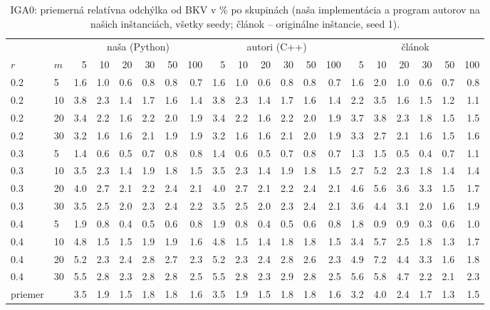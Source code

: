 \begin{table}[ht]
\centering
\scriptsize
\setlength{\tabcolsep}{3pt}
\caption{IGA0: priemerná relatívna odchýlka od BKV v \% po skupinách (naša implementácia a program autorov na našich inštanciách, všetky seedy; článok – originálne inštancie, seed 1).}
\label{tab:rpd_iga0}
\begin{tabular}{ll|rrrrrr|rrrrrr|rrrrrr}
\toprule
 &  & \multicolumn{6}{c}{naša (Python)} & \multicolumn{6}{c}{autori (C++)} & \multicolumn{6}{c}{článok} \\
$r$ & $m$ & 5 & 10 & 20 & 30 & 50 & 100 & 5 & 10 & 20 & 30 & 50 & 100 & 5 & 10 & 20 & 30 & 50 & 100 \\
\midrule
0.2 & 5 & 1.6 & 1.0 & 0.6 & 0.8 & 0.8 & 0.7 & 1.6 & 1.0 & 0.6 & 0.8 & 0.8 & 0.7 & 1.6 & 2.0 & 1.0 & 0.6 & 0.7 & 0.8 \\
0.2 & 10 & 3.8 & 2.3 & 1.4 & 1.7 & 1.6 & 1.4 & 3.8 & 2.3 & 1.4 & 1.7 & 1.6 & 1.4 & 2.2 & 3.5 & 1.6 & 1.5 & 1.2 & 1.1 \\
0.2 & 20 & 3.4 & 2.2 & 1.6 & 2.2 & 2.0 & 1.9 & 3.4 & 2.2 & 1.6 & 2.2 & 2.0 & 1.9 & 3.7 & 3.8 & 2.3 & 1.8 & 1.5 & 1.5 \\
0.2 & 30 & 3.2 & 1.6 & 1.6 & 2.1 & 1.9 & 1.9 & 3.2 & 1.6 & 1.6 & 2.1 & 2.0 & 1.9 & 3.3 & 2.7 & 2.1 & 1.6 & 1.5 & 1.6 \\
0.3 & 5 & 1.4 & 0.6 & 0.5 & 0.7 & 0.8 & 0.8 & 1.4 & 0.6 & 0.5 & 0.7 & 0.8 & 0.7 & 1.3 & 1.5 & 0.5 & 0.4 & 0.7 & 1.1 \\
0.3 & 10 & 3.5 & 2.3 & 1.4 & 1.9 & 1.8 & 1.5 & 3.5 & 2.3 & 1.4 & 1.9 & 1.8 & 1.5 & 2.7 & 5.2 & 2.3 & 1.8 & 1.4 & 1.4 \\
0.3 & 20 & 4.0 & 2.7 & 2.1 & 2.2 & 2.4 & 2.1 & 4.0 & 2.7 & 2.1 & 2.2 & 2.4 & 2.1 & 4.6 & 5.6 & 3.6 & 3.3 & 1.5 & 1.7 \\
0.3 & 30 & 3.5 & 2.5 & 2.0 & 2.3 & 2.4 & 2.2 & 3.5 & 2.5 & 2.0 & 2.3 & 2.4 & 2.1 & 3.6 & 4.4 & 3.1 & 2.0 & 1.6 & 1.9 \\
0.4 & 5 & 1.9 & 0.8 & 0.4 & 0.5 & 0.6 & 0.8 & 1.9 & 0.8 & 0.4 & 0.5 & 0.6 & 0.8 & 1.8 & 0.9 & 0.9 & 0.3 & 0.6 & 1.0 \\
0.4 & 10 & 4.8 & 1.5 & 1.5 & 1.9 & 1.9 & 1.6 & 4.8 & 1.5 & 1.4 & 1.8 & 1.8 & 1.5 & 3.4 & 5.7 & 2.5 & 1.8 & 1.3 & 1.7 \\
0.4 & 20 & 5.2 & 2.3 & 2.4 & 2.8 & 2.7 & 2.3 & 5.2 & 2.3 & 2.4 & 2.8 & 2.6 & 2.3 & 4.9 & 7.2 & 4.4 & 3.3 & 1.6 & 1.8 \\
0.4 & 30 & 5.5 & 2.8 & 2.3 & 2.8 & 2.8 & 2.5 & 5.5 & 2.8 & 2.3 & 2.9 & 2.8 & 2.5 & 5.6 & 5.8 & 4.7 & 2.2 & 2.1 & 2.3 \\
\midrule
priemer &  & 3.5 & 1.9 & 1.5 & 1.8 & 1.8 & 1.6 & 3.5 & 1.9 & 1.5 & 1.8 & 1.8 & 1.6 & 3.2 & 4.0 & 2.4 & 1.7 & 1.3 & 1.5 \\
\bottomrule
\end{tabular}
\end{table}
